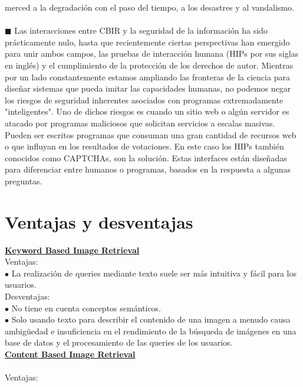 \documentclass{llncs}
\begin{document}
merced a la degradación con el paso del tiempo, a los desastres y al vandalismo.
\\\\
\noindent $\blacksquare$ Las interacciones entre CBIR y la seguridad de la información ha sido prácticamente nulo, hasta que recientemente ciertas perspectivas 
han emergido  para unir ambos campos, las pruebas de interacción humana (HIPs por sus siglas en inglés) y el cumplimiento de 
la protección de los derechos de autor. Mientras por un lado constantemente estamos ampliando las fronteras de la ciencia para 
diseñar sistemas que pueda imitar las capacidades humanas, no podemos negar los riesgos de seguridad inherentes asociados con 
programas extremadamente "inteligentes". Uno de dichos riesgos es cuando un sitio web o algún servidor es atacado por programas 
maliciosos que solicitan servicios a escalas masivas. Pueden ser escritos programas que consuman una gran cantidad de recursos web o 
que influyan en los resultados de votaciones. En este caso los HIPs también conocidos como CAPTCHAs, son la solución. Estas interfaces 
están diseñadas para diferenciar entre humanos o programas, basados en la respuesta a algunas preguntas.



\chapter*{Ventajas y desventajas}

\underline {\bf Keyword Based Image Retrieval}\\

Ventajas:\\
\noindent$\bullet$ La realizaci\'on de queries mediante texto suele ser m\'as intuitiva y f\'acil para los usuarios.\\

Desventajas:\\
\noindent$\bullet$ No tiene en cuenta conceptos sem\'anticos.\\
$\bullet$ Solo usando texto para describir el contenido de una imagen a menudo causa ambig\"{u}edad e insuficiencia en el rendimiento
de la b\'usqueda de im\'agenes en una base de datos y el procesamiento de las queries de los usuarios.\\

\underline {\bf Content Based Image Retrieval}\\\\
Ventajas:\\
\end{document}
